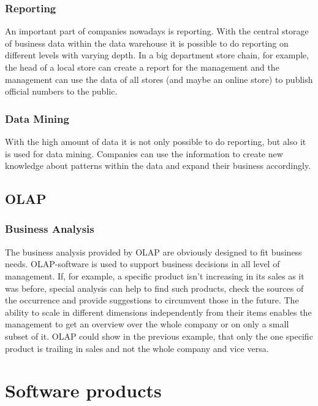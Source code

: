 \documentclass[12pt,a4paper,oneside,
liststotoc, 					%
bibtotoc,						%
titlepage, 						%
headsepline, 					%
BCOR6mm,						%
openany,							%
]{scrreprt}
\begin{document}
\subsection{Reporting}\label{ucreport}
An important part of companies nowadays is reporting. With the central storage of business data within the data warehouse it is possible to do reporting on different levels with varying depth. In a big department store chain, for example, the head of a local store can create a report for the management and the management can use the data of all stores (and maybe an online store) to publish official numbers to the public.
\subsection{Data Mining}\label{ucmining}
With the high amount of data it is not only possible to do reporting, but also it is used for data mining. Companies can use the information to create new knowledge about patterns within the data and expand their business accordingly. 
\section{OLAP}\label{ucolap}
\subsection{Business Analysis}\label{ba}
The business analysis provided by OLAP are obviously designed to fit business needs. OLAP-software is used to support business decisions in all level of management. If, for example, a specific product isn't increasing in its sales as it was before, special analysis can help to find such products, check the sources of the occurrence and provide suggestions to circumvent those in the future. The ability to scale in different dimensions independently from their items enables the management to get an overview over the whole company or on only a small subset of it. OLAP could show in the previous example, that only the one specific product is trailing in sales and not the whole company and vice versa.
\chapter{Software products}\label{software}
\end{document}
